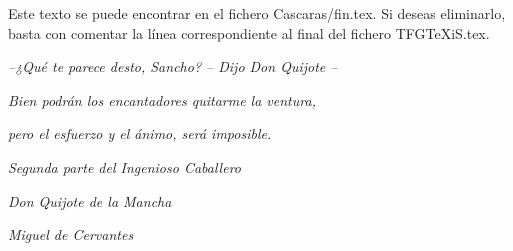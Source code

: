 %
%
%
%
%
%
%
%
%
%
%
%


\ifpdf
\fi

\thispagestyle{empty}\mbox{}

Este texto se puede encontrar en el fichero Cascaras/fin.tex. Si deseas eliminarlo, basta con comentar la línea correspondiente al final del fichero TFGTeXiS.tex.

\vspace*{4cm}

\small

\hfill \emph{--¿Qué te parece desto, Sancho? -- Dijo Don Quijote --}

\hfill \emph{Bien podrán los encantadores quitarme la ventura,}

\hfill \emph{pero el esfuerzo y el ánimo, será imposible.}

\hfill 

\hfill \emph{Segunda parte del Ingenioso Caballero} 

\hfill \emph{Don Quijote de la Mancha}

\hfill \emph{Miguel de Cervantes}

